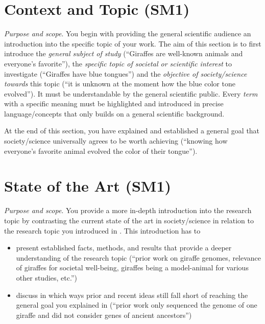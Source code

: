 \documentclass[../thesis-example-en]{subfiles}
\begin{document}
\section{Context and Topic (SM1)}\label{sec:introduction:topic}

\emph{Purpose and scope}.
You begin with providing the general scientific audience an introduction into the specific topic of your work.
The aim of this section is to first introduce the \emph{general subject of study} (``Giraffes are well-known animals and everyone's favorite''), the \emph{specific topic of societal or scientific interest} to investigate (``Giraffes have blue tongues'') and the \emph{objective of society/science towards} this topic (``it is unknown at the moment how the blue color tone evolved'').
It must be understandable by the general scientific public.
Every \emph{term} with a specific meaning must be highlighted and introduced in precise language/concepts that only builds on a general scientific background.

At the end of this section, you have explained and established a general goal that society/science universally agrees to be worth achieving (``knowing how everyone's favorite animal evolved the color of their tongue'').

\section{State of the Art (SM1)}\label{sec:introduction:state-of-art}

\emph{Purpose and scope}.
You provide a more in-depth introduction into the research topic by contrasting the current state of the art in society/science in relation to the research topic you introduced in .
This introduction has to

\begin{itemize}
  \item present established facts, methods, and results that provide a deeper understanding of the research topic (``prior work on giraffe genomes, relevance of giraffes for societal well-being, giraffes being a model-animal for various other studies, etc.'')
  \item discuss in which ways prior and recent ideas still fall short of reaching the general goal you explained in  (``prior work only sequenced the genome of one giraffe and did not consider genes of ancient ancestors'')
\end{itemize}
\end{document}
